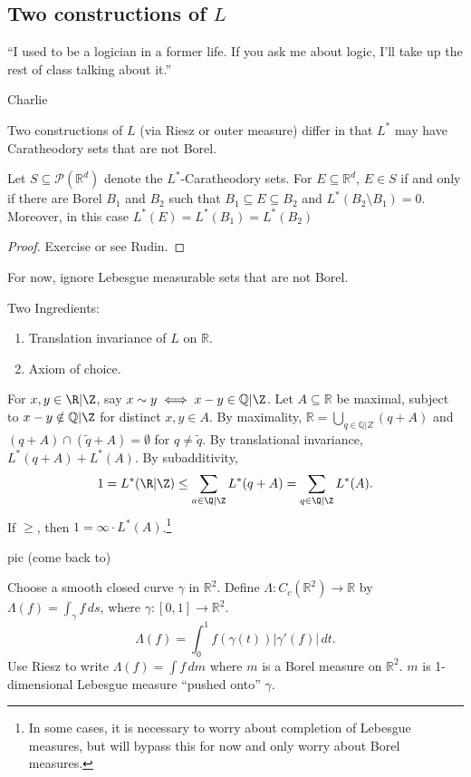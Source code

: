 \subsection{\texorpdfstring{Two constructions of $L$}{Two constructions of L}}
\epigraph{``I used to be a logician in a former life. If you ask me about logic, I'll take up the rest of class talking about it.''}{Charlie}

Two constructions of $L$ (via Riesz or outer measure) differ in that $L^*$ may have Caratheodory sets that are not Borel.

\begin{theorem}
	Let $S \subseteq \mathcal{P}(\mathbb{R}^d)$ denote the $L^*$-Caratheodory sets. For $E \subseteq
	\mathbb{R}^d$, $E \in S$ if and only if there are Borel $B_1$ and $B_2$ such that 
	$B_1 \subseteq E \subseteq B_2$ and $L^*(B_2 \setminus B_1) = 0$. 
	Moreover, in this case  $L^*(E) = L^*(B_1) = L^*(B_2)$
\end{theorem}
\begin{proof}
	Exercise or see Rudin.
\end{proof}
For now, ignore Lebesgue measurable sets that are not Borel.

\begin{example}
	Two Ingredients:
	\begin{enumerate}
		\item Translation invariance of $L$ on $\mathbb{R}$.
		\item Axiom of choice.
	\end{enumerate}

	For $x, y \in \R | \Z$, say $x \sim y \iff x - y \in  \mathbb{Q} | \Z$.
	Let $A \subseteq \mathbb{R}$ be maximal, subject to $x - y \notin \mathbb{Q} | \Z$ for distinct $x,y \in A$.
	By maximality, $\mathbb{R} = \bigcup_{q \in \mathbb{Q} | Z} (q + A)$
	and $(q + A) \cap (\tilde{q} + A) = \emptyset$ for $q \neq \tilde{q}$.
	By translational invariance, $L^*(q + A) + L^*(A)$. By subadditivity, 
	\[
		1 = L^*(\R | \Z) \leq \sum_{a \in \Q | \Z} L^*(q + A) = \sum_{q \in \Q | \Z} L^*(A).
	\]
	If $\geq$, then $1 = \infty \cdot L^*(A)$.\footnote{In some cases, it is necessary to worry about completion of Lebesgue measures, but will bypass this for now and only worry about Borel measures.} 
\end{example}
pic (come back to)

\begin{definition}
	Choose a smooth closed curve $\gamma$ in $\mathbb{R}^2$. Define $\Lambda : C_c(\mathbb{R}^2) \to \mathbb{R}$ by $\Lambda (f) = \int_{\gamma} f \, ds$, where $\gamma :[0,1] \to \mathbb{R}^2$.
	\[
		\Lambda (f) = \int_{0}^{1} f(\gamma(t)) |\gamma'(f)| \, dt.
	\]
	Use Riesz to write $\Lambda (f) = \int f \, dm$ where $m$ is a Borel measure on $\mathbb{R}^2$.
	$m$ is 1-dimensional Lebesgue measure ``pushed onto'' $\gamma$.
\end{definition}

